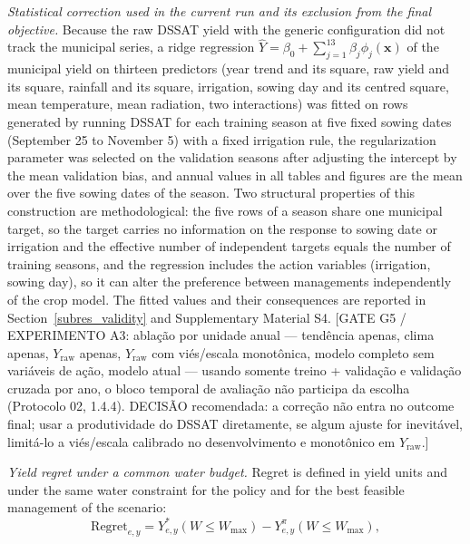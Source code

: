 \documentclass[times,final,authoryear]{elsarticle}
\begin{document}
\emph{Statistical correction used in the current run and its exclusion from the final objective.} Because the raw DSSAT yield with the generic configuration did not track the municipal series, a ridge regression $\hat{Y} = \beta_0 + \sum_{j=1}^{13} \beta_j \phi_j(\mathbf{x})$ of the municipal yield on thirteen predictors (year trend and its square, raw yield and its square, rainfall and its square, irrigation, sowing day and its centred square, mean temperature, mean radiation, two interactions) was fitted on rows generated by running DSSAT for each training season at five fixed sowing dates (September 25 to November 5) with a fixed irrigation rule, the regularization parameter was selected on the validation seasons after adjusting the intercept by the mean validation bias, and annual values in all tables and figures are the mean over the five sowing dates of the season. Two structural properties of this construction are methodological: the five rows of a season share one municipal target, so the target carries no information on the response to sowing date or irrigation and the effective number of independent targets equals the number of training seasons, and the regression includes the action variables (irrigation, sowing day), so it can alter the preference between managements independently of the crop model. The fitted values and their consequences are reported in Section~\ref{subres_validity} and Supplementary Material S4. [GATE G5 / EXPERIMENTO A3: ablação por unidade anual --- tendência apenas, clima apenas, $Y_{\text{raw}}$ apenas, $Y_{\text{raw}}$ com viés/escala monotônica, modelo completo sem variáveis de ação, modelo atual --- usando somente treino + validação e validação cruzada por ano, o bloco temporal de avaliação não participa da escolha (Protocolo 02, 1.4.4). DECISÃO recomendada: a correção não entra no outcome final; usar a produtividade do DSSAT diretamente, se algum ajuste for inevitável, limitá-lo a viés/escala calibrado no desenvolvimento e monotônico em $Y_{\text{raw}}$.]

\emph{Yield regret under a common water budget.} Regret is defined in yield units and under the same water constraint for the policy and for the best feasible management of the scenario:
\begin{equation}

\mathrm{Regret}_{e,y} = Y^{*}_{e,y}(W \leq W_{\max}) - Y^{\pi}_{e,y}(W \leq W_{\max}),

\label{eq_regret}
\end{equation}
\end{document}
